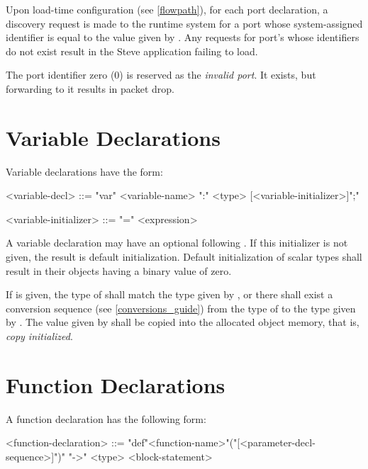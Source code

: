 Upon load-time configuration (see \ref{flowpath}), for each port declaration, a discovery request is made to the runtime system for a port whose system-assigned identifier is equal to the value given by . Any requests for port's whose identifiers do not exist result in the Steve application failing to load.

The port identifier zero (0) is reserved as the \textit{invalid port}. It exists, but forwarding to it results in packet drop.

\section{Variable Declarations} \label{variable_guide}

Variable declarations have the form:

\begin{minip}
\begin{grammar}
<variable-decl> ::=
"var" <variable-name> ":" <type> [<variable-initializer>]";"

<variable-initializer> ::= "=" <expression>
\end{grammar}
\end{minip}

A variable declaration may have an optional  following .  If this initializer is not given, the result is default initialization. Default initialization of scalar types shall result in their objects having a binary value of zero.

If  is given, the type of  shall match the type given by , or there shall exist a conversion sequence (see \ref{conversions_guide}) from the type of  to the type given by . The value given by  shall be copied into the allocated object memory, that is, \textit{copy initialized}.

\section{Function Declarations} \label{function_guide}

A function declaration has the following form:

\begin{minip}
\begin{grammar}
<function-declaration> ::=
"def"<function-name>"("[<parameter-decl-sequence>]")" "->" <type> <block-statement>
\end{grammar}
\end{minip}

